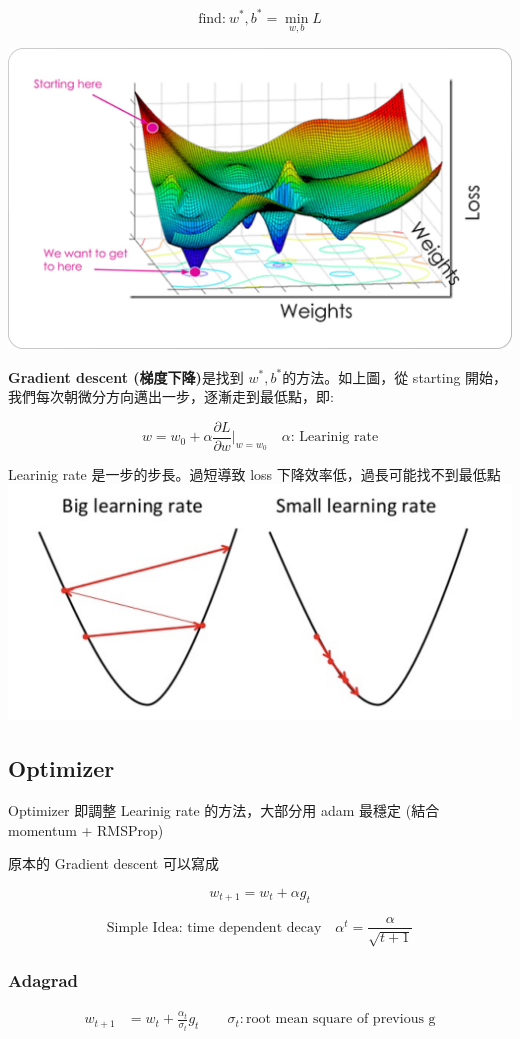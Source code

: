$$
\mbox{find:}\ w^*, b^* = \min_{w,b} L
$$

\includegraphics[width=.6\textwidth]{paste_src/2025-03-20-03-16-44.png}

\textbf{Gradient descent (梯度下降)}是找到 $w^*, b^*$的方法。如上圖，從 starting 開始，我們每次朝微分方向邁出一步，逐漸走到最低點，即:

$$w = w_0+\alpha\frac{\partial L}{\partial w}|_{w=w_0} \quad\alpha \mbox{: Learinig rate}$$

Learinig rate 是一步的步長。過短導致 loss 下降效率低，過長可能找不到最低點
\includegraphics[width=.6\textwidth]{paste_src/2025-03-20-05-09-19.png}

\subsection{Optimizer}
Optimizer 即調整 Learinig rate 的方法，大部分用 adam 最穩定 (結合 momentum + RMSProp)

原本的 Gradient descent 可以寫成 

$$ 
w_{t+1}= w_t + \alpha g_t 
$$

$$
\mbox{Simple Idea: time dependent decay} \quad \alpha^t = \frac{\alpha}{\sqrt{t+1}}
$$






\subsubsection*{Adagrad} 

\begin{align}
  w_{t+1} &= w_t + \frac{\alpha_t}{\sigma_t} g_t \qquad \sigma_t: \mbox{root mean square of previous g}
\end{align}

